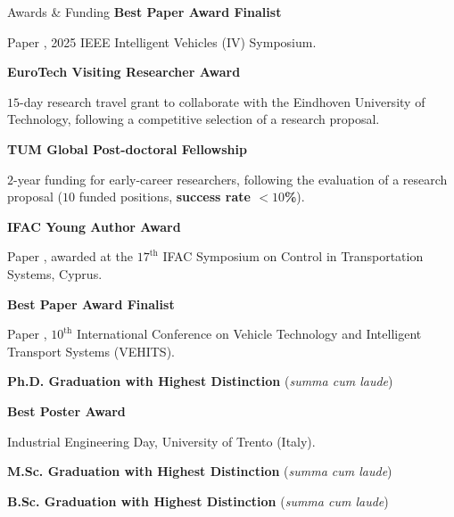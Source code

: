 \begin{rubric}{Awards \& Funding}
\entry*[06/2025]%
	\textbf{Best Paper Award Finalist} 
		\par Paper \cite{Werner2025}, 2025 IEEE Intelligent Vehicles (IV) Symposium.

\entry*[03/2025]%
	\textbf{EuroTech Visiting Researcher Award} 
    \par $15$-day research travel grant to collaborate with the Eindhoven University of Technology, following a competitive selection of a research proposal.
    
\entry*[12/2024]%
	\textbf{TUM Global Post-doctoral Fellowship} 
    \par $2$-year funding for early-career researchers, following the evaluation of a research proposal ($10$ funded positions,
		\textbf{success rate $<10$\%}).

\entry*[07/2024]%
	\textbf{IFAC Young Author Award} 
    \par Paper \cite{Piccinini2024IFAC}, awarded at the $17^{\mathrm{th}}$ IFAC Symposium on Control in Transportation Systems, Cyprus.

\entry*[05/2024]%
	\textbf{Best Paper Award Finalist} 
    \par Paper \cite{Gottschalk2024}, $10^{\mathrm{th}}$ International Conference on Vehicle Technology and Intelligent Transport Systems (VEHITS).

\entry*[04/2024]%
	\textbf{Ph.D. Graduation with Highest Distinction} (\textit{summa cum laude})

\entry*[11/2023]%
	\textbf{Best Poster Award}
    \par Industrial Engineering Day, University of Trento (Italy).

\entry*[10/2019]%
	\textbf{M.Sc. Graduation with Highest Distinction} (\textit{summa cum laude})

\entry*[09/2017]%
	\textbf{B.Sc. Graduation with Highest Distinction} (\textit{summa cum laude})

\end{rubric}
    